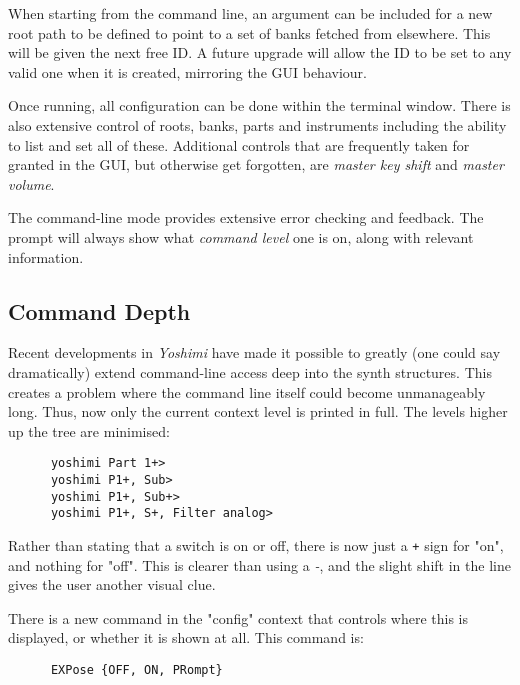   When starting from the command line, an argument can be included for a new
   root path to be defined to point to a set of banks fetched from elsewhere.
   This will be given the next free ID. A future upgrade will allow the ID to
   be set to any valid one when it is created, mirroring the GUI behaviour.

   Once running, all configuration can be done within the terminal window.
   There is also extensive control of roots, banks, parts and instruments
   including the ability to list and set all of these.
   Additional controls that are frequently taken for granted in the GUI, but
   otherwise get forgotten, are \textsl{master key shift} and \textsl{master
   volume}.

   The command-line mode provides extensive error checking and feedback.
   The prompt will always show what \textsl{command level}
   one is on, along with relevant information.

   \subsection{Command Depth}
\label{subsec:command_line_command_depth}

   Recent developments in \textsl{Yoshimi} have made it possible to greatly
   (one could say dramatically) extend command-line access deep into the
   synth structures. This creates a problem where the command line itself
   could become unmanageably long.
   Thus, now only the current context level is printed in full. The levels
   higher up the tree are minimised:

   \begin{verbatim}
      yoshimi Part 1+>
      yoshimi P1+, Sub>
      yoshimi P1+, Sub+>
      yoshimi P1+, S+, Filter analog>
   \end{verbatim}

   Rather than stating that a switch is on or off, there is now just a
   \texttt{+} sign for "on", and nothing for "off". This is clearer than
   using a \textsl{-}, and the slight shift in the line gives the user
   another visual clue.

   There is a new command in the "config" context that controls where this is
   displayed, or whether it is shown at all.
   This command is:

   \begin{verbatim}
      EXPose {OFF, ON, PRompt}
   \end{verbatim}

